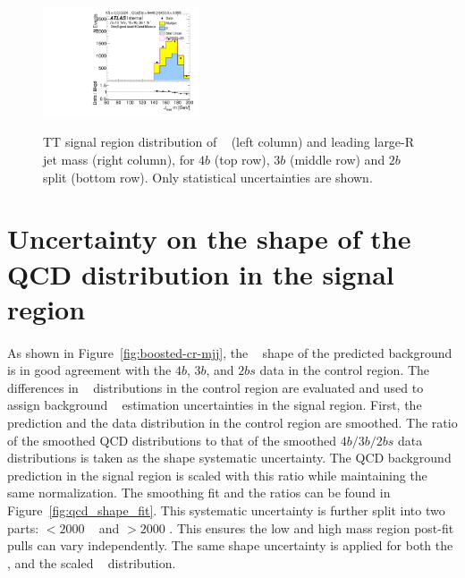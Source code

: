 \begin{figure}[htb!]
\begin{center}
\includegraphics[width=0.41\textwidth,angle=-90]{figures/boosted/TT/Moriond_TT_TwoTag_split_Signal_leadHCand_Mass_s.pdf}\\
\end{center}
\caption{TT signal region distribution of \mtwoJ~ (left column) and leading large-R jet mass (right column), for $4b$ (top row), $3b$ (middle row) and $2b$ split (bottom row). Only statistical uncertainties are shown.}
\label{fig:TTSR_Distribution}
\end{figure}

\section{Uncertainty on the shape of the QCD distribution in the signal region}
\label{unc-shape-qcd-in-sr}
\paragraph{}
As shown in Figure~\ref{fig:boosted-cr-mjj}, the \mtwoJ~ shape of the predicted background is in good agreement with the $4b$, $3b$, and $2bs$ data in the control region.
The differences in \mtwoJ~ distributions in the control region are evaluated and used to assign background \mtwoJ~ estimation uncertainties in the signal region. 
First, the prediction and the data distribution in the control region are smoothed.
The ratio of the smoothed QCD distributions to that of the smoothed $4b/3b/2bs$ data distributions is taken as the shape systematic uncertainty. 
The QCD background prediction in the signal region is scaled with this ratio while maintaining the same normalization. 
The smoothing fit and the ratios can be found in Figure~\ref{fig:qcd_shape_fit}. 
This systematic uncertainty is further split into two parts: \mtwoJ $< 2000$ \GeV~ and \mtwoJ $> 2000$ \GeV.
This ensures the low and high mass region post-fit pulls can vary independently.
The same shape uncertainty is applied for both the \mtwoJ, and the scaled \mtwoJ~ distribution. 

